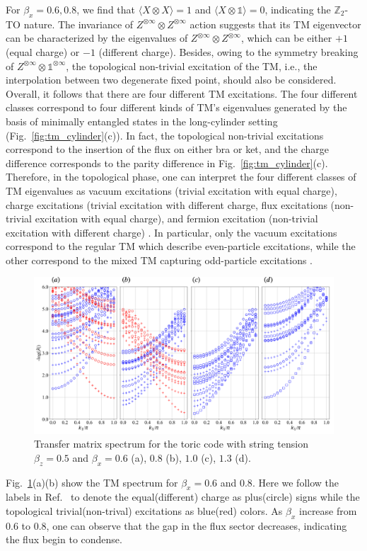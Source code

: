\documentclass{ntuthesis}
\newcommand{\citep}{\cite}
\begin{document}
For $\beta_x = 0.6,0.8$, we find that $\langle X \otimes X  \rangle = 1$ and $\langle X \otimes \mathbb{1}  \rangle = 0$, indicating the $\mathbb{Z}_2$-TO nature. 
%
The invariance of $Z^{\otimes \infty} \otimes Z^{\otimes \infty}$ action suggests that its TM eigenvector can be characterized by the eigenvalues of $ Z^{\otimes \infty} \otimes Z^{\otimes \infty} $, which can be either $+1$ (equal charge) or $-1$ (different charge).
%
Besides, owing to the symmetry breaking of $Z^{\otimes \infty} \otimes \mathbb{1}^{\otimes \infty}$, the topological non-trivial excitation of the TM, i.e., the interpolation between two degenerate fixed point, should also be considered. Overall, it follows that there are four different TM excitations. 
%
The four different classes correspond to four different kinds of TM's eigenvalues generated by the basis of minimally entangled states in the long-cylinder setting (Fig.~\ref{fig:tm_cylinder}(c)). In fact, the topological non-trivial excitations correspond to the insertion of the flux on either bra or ket, and the charge difference corresponds to the parity difference in Fig.~\ref{fig:tm_cylinder}(c).
%
Therefore, in the topological phase, one can interpret the four different classes of TM eigenvalues as vacuum excitations (trivial excitation with equal charge), charge excitations (trivial excitation with different charge, flux excitations (non-trivial excitation with equal charge), and fermion excitation (non-trivial excitation with different charge) \citep{Haegeman_2015, 2015_Zauner}. In particular, only the vacuum excitations correspond to the regular TM which describe even-particle excitations, while the other correspond to the mixed TM capturing odd-particle excitations \citep{2015_Zauner}.

\begin{figure}[h]
\centering
\includegraphics[width=\linewidth]{spectrum_TC}
\caption{Transfer matrix spectrum for the toric code with string tension $\beta_z = 0.5$ and $\beta_x = 0.6$ (a), $0.8$ (b), $1.0$ (c), $1.3$ (d).} 
\label{fig:spectrum_TC}
\end{figure}
%
Fig.~\ref{fig:spectrum_TC}(a)(b) show the TM spectrum for $\beta_x = 0.6$ and $0.8$. Here we follow the labels in Ref.~\citep{Haegeman_2015} to denote the equal(different) charge as plus(circle) signs while the topological trivial(non-trival) excitations as blue(red) colors. As $\beta_x$ increase from $0.6$ to $0.8$, one can observe that the gap in the flux sector decreases, indicating the flux begin to condense.
%
\end{document}
